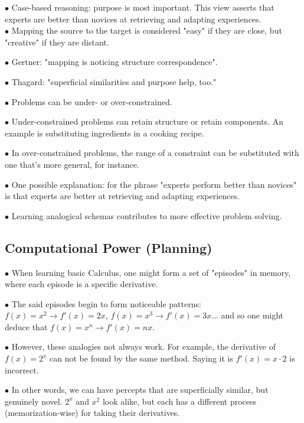 \documentclass[english,openany]{book}
\begin{document}

$\bullet$ Case-based reasoning: purpose is most important. This view asserts that experts are better than novices at retrieving and adapting experiences.\\

$\bullet$ Mapping the source to the target is considered "easy" if they are close, but "creative" if they are distant.

$\bullet$ Gertner: "mapping is noticing structure correspondence".

$\bullet$ Thagard: "superficial similarities and purpose help, too."

$\bullet$ Problems can be under- or over-constrained. 

$\bullet$ Under-constrained problems can retain structure or retain components. An example is substituting ingredients in a cooking recipe.

$\bullet$ In over-constrained problems, the range of a constraint can be substituted with one that's more general, for instance.

$\bullet$ One possible explanation: for the phrase "experts perform better than novices" is that experts are better at retrieving and adapting experiences.

$\bullet$ Learning analogical schemas contributes to more effective problem solving.

\subsection{Computational Power (Planning)}

$\bullet$ When learning basic Calculus, one might form a set of "episodes" in memory, where each episode is a specific derivative. 

$\bullet$ The said episodes begin to form noticeable patterns: $f(x) = x^2 \rightarrow f'(x) = 2x$, $f(x) = x^3 \rightarrow f'(x) = 3x$... and so one might deduce that $f(x) = x^n \rightarrow f'(x) = nx$.

$\bullet$ However, these analogies not always work. For example, the derivative of $f(x) = 2^x$ can not be found by the same method. Saying it is $f'(x) = x \cdot 2$ is incorrect.

$\bullet$ In other words, we can have percepts that are superficially similar, but genuinely novel. $2^x$ and $x^2$ look alike, but each has a different process (memorization-wise) for taking their derivatives.\\
\end{document}
